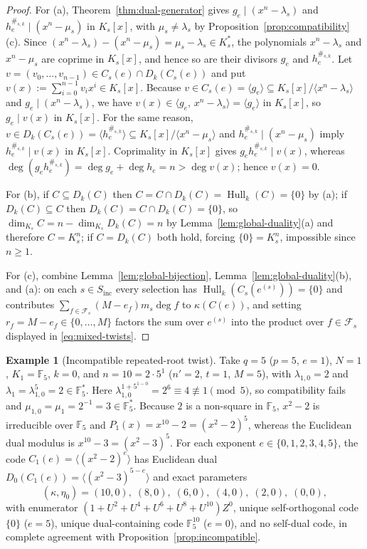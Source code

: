\documentclass[preprint,12pt]{elsarticle}
\newcommand{\F}{\mathbb F}
\newcommand{\Fs}{\mathcal F_s}
\newcommand{\Hull}{\operatorname{Hull}}
\newcommand{\Dk}{D_k}
\numberwithin{equation}{section}
\theoremstyle{plain}
\theoremstyle{definition}
\newtheorem{example}[theorem]{Example}
\theoremstyle{remark}
\begin{document}
\begin{proof}
For \textup{(a)}, Theorem~\ref{thm:dual-generator} gives $g_e\mid(x^n-\lambda_s)$
and $h_e^{\#_{s,k}}\mid(x^n-\mu_s)$ in $K_s[x]$, with $\mu_s\neq\lambda_s$ by
Proposition~\ref{prop:compatibility}\textup{(c)}. Since
$(x^n-\lambda_s)-(x^n-\mu_s)=\mu_s-\lambda_s\in K_s^*$, the polynomials
$x^n-\lambda_s$ and $x^n-\mu_s$ are coprime in $K_s[x]$, and hence so are their
divisors $g_e$ and $h_e^{\#_{s,k}}$. Let $v=(v_0,\dots,v_{n-1})\in
C_s(e)\cap\Dk(C_s(e))$ and put $v(x):=\sum_{i=0}^{n-1}v_i x^i\in K_s[x]$. Because
$v\in C_s(e)=\langle g_e\rangle\subseteq K_s[x]/\langle x^n-\lambda_s\rangle$ and
$g_e\mid(x^n-\lambda_s)$, we have $v(x)\in\langle g_e,\,x^n-\lambda_s\rangle
=\langle g_e\rangle$ in $K_s[x]$, so $g_e\mid v(x)$ in $K_s[x]$. For the same
reason, $v\in\Dk(C_s(e))=\langle h_e^{\#_{s,k}}\rangle\subseteq
K_s[x]/\langle x^n-\mu_s\rangle$ and $h_e^{\#_{s,k}}\mid(x^n-\mu_s)$ imply
$h_e^{\#_{s,k}}\mid v(x)$ in $K_s[x]$. Coprimality in $K_s[x]$ gives
$g_e h_e^{\#_{s,k}}\mid v(x)$, whereas
$\deg(g_e h_e^{\#_{s,k}})=\deg g_e+\deg h_e=n>\deg v(x)$; hence $v(x)=0$.

For \textup{(b)}, if $C\subseteq\Dk(C)$ then $C=C\cap\Dk(C)=\Hull_k(C)=\{0\}$ by
\textup{(a)}; if $\Dk(C)\subseteq C$ then $\Dk(C)=C\cap\Dk(C)=\{0\}$, so
$\dim_{K_s}C=n-\dim_{K_s}\Dk(C)=n$ by Lemma~\ref{lem:global-duality}\textup{(a)}
and therefore $C=K_s^n$; if $C=\Dk(C)$ both hold, forcing $\{0\}=K_s^n$,
impossible since $n\ge 1$.

For \textup{(c)}, combine Lemma~\ref{lem:global-bijection},
Lemma~\ref{lem:global-duality}\textup{(b)}, and \textup{(a)}: on each
$s\in S_{\mathrm{inc}}$ every selection has $\Hull_k(C_s(e^{(s)}))=\{0\}$ and
contributes $\sum_{f\in\Fs}(M-e_f)m_s\deg f$ to $\kappa(C(e))$, and setting
$r_f=M-e_f\in\{0,\dots,M\}$ factors the sum over $e^{(s)}$ into the product over
$f\in\Fs$ displayed in \eqref{eq:mixed-twists}.
\end{proof}

\begin{example}[Incompatible repeated-root twist]\label{ex:incompatible-F5}
Take $q=5$ ($p=5$, $e=1$), $N=1$, $K_1=\F_5$, $k=0$, and $n=10=2\cdot 5^1$
($n'=2$, $t=1$, $M=5$), with $\lambda_{1,0}=2$ and
$\lambda_1=\lambda_{1,0}^5=2\in\F_5^*$. Here
$\lambda_{1,0}^{1+5^{1-0}}=2^6\equiv 4\not\equiv 1\pmod 5$, so compatibility
fails and $\mu_{1,0}=\mu_1=2^{-1}=3\in\F_5^*$. Because $2$ is a non-square in
$\F_5$, $x^2-2$ is irreducible over $\F_5$ and $P_1(x)=x^{10}-2=(x^2-2)^5$,
whereas the Euclidean dual modulus is $x^{10}-3=(x^2-3)^5$. For each exponent
$e\in\{0,1,2,3,4,5\}$, the code $C_1(e)=\langle(x^2-2)^e\rangle$ has Euclidean
dual $D_0(C_1(e))=\langle(x^2-3)^{5-e}\rangle$ and exact parameters
\[
(\kappa,\eta_0)=(10,0),\;(8,0),\;(6,0),\;(4,0),\;(2,0),\;(0,0),
\]
with enumerator $(1+U^2+U^4+U^6+U^8+U^{10})Z^0$, unique self-orthogonal code
$\{0\}$ ($e=5$), unique dual-containing code $\F_5^{10}$ ($e=0$), and no
self-dual code, in complete agreement with Proposition~\ref{prop:incompatible}.
\end{example}
\end{document}
